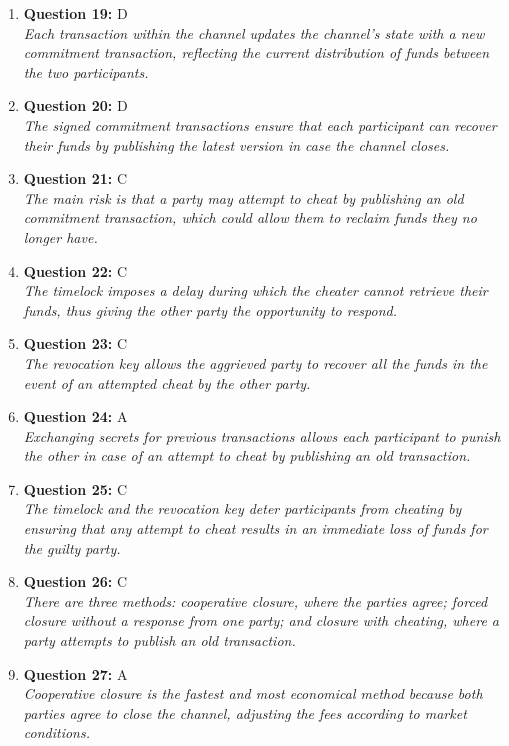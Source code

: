 \documentclass[12pt,a4paper]{article}
\begin{document}
\begin{enumerate}
\item \textbf{Question 19:} D
\\ \textit{Each transaction within the channel updates the channel's state with a new commitment transaction, reflecting the current distribution of funds between the two participants.}

\item \textbf{Question 20:} D
\\ \textit{The signed commitment transactions ensure that each participant can recover their funds by publishing the latest version in case the channel closes.}

\item \textbf{Question 21:} C
\\ \textit{The main risk is that a party may attempt to cheat by publishing an old commitment transaction, which could allow them to reclaim funds they no longer have.}

\item \textbf{Question 22:} C
\\ \textit{The timelock imposes a delay during which the cheater cannot retrieve their funds, thus giving the other party the opportunity to respond.}

\item \textbf{Question 23:} C
\\ \textit{The revocation key allows the aggrieved party to recover all the funds in the event of an attempted cheat by the other party.}

\item \textbf{Question 24:} A
\\ \textit{Exchanging secrets for previous transactions allows each participant to punish the other in case of an attempt to cheat by publishing an old transaction.}

\item \textbf{Question 25:} C
\\ \textit{The timelock and the revocation key deter participants from cheating by ensuring that any attempt to cheat results in an immediate loss of funds for the guilty party.}

\item \textbf{Question 26:} C
\\ \textit{There are three methods: cooperative closure, where the parties agree; forced closure without a response from one party; and closure with cheating, where a party attempts to publish an old transaction.}

\item \textbf{Question 27:} A
\\ \textit{Cooperative closure is the fastest and most economical method because both parties agree to close the channel, adjusting the fees according to market conditions.}


\end{enumerate}
\end{document}
